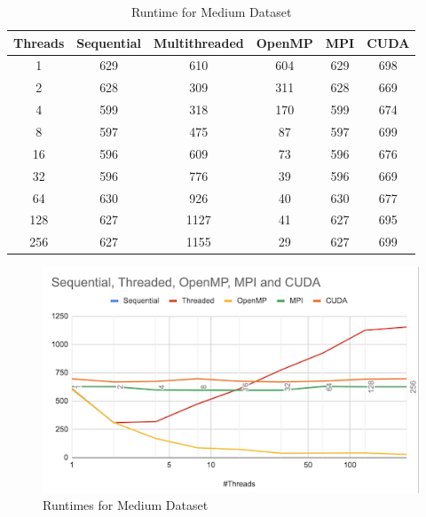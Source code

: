 \documentclass[conference]{IEEEtran}
\begin{document}
\begin{table}
    \begin{tabular}{||c | c | c | c | c | c||} 
     \hline
     Threads & Sequential & Multithreaded & OpenMP & MPI & CUDA \\ [0.2ex] 
     \hline\hline
    1 & 629	& 610 & 604 & 629	& 698\\ [1ex] 
     \hline
    2 & 628	& 309 & 311 & 628	& 669\\ [1ex] 
     \hline
    4 & 599	& 318 & 170 & 599	& 674\\ [1ex] 
     \hline
    8 & 597 & 475 & 87 & 597	& 699\\ [1ex] 
     \hline
    16 & 596 & 609 & 73 & 596	& 676\\ [1ex] 
     \hline
    32 & 596 & 776 & 39 & 596	& 669\\ [1ex] 
     \hline
    64 & 630 & 926 & 40 & 630 & 677\\ [1ex] 
     \hline
    128 & 627 & 1127 & 41 & 627 & 695\\ [1ex] 
     \hline
    256 & 627 & 1155 & 29 & 627 & 699\\ [1ex] 
     \hline
    \end{tabular}
\caption{\label{tab:Table3}Runtime for Medium Dataset}
\end{table}

\begin{figure}[htbp]
\centerline{\includegraphics{report/rt_medium_set.png}}
\caption{Runtimes for Medium Dataset}
\label{fig3}
\end{figure}
\end{document}
